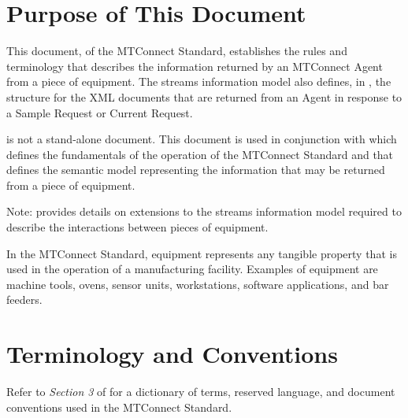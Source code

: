 \section{Purpose of This Document}

This document,  of the MTConnect  Standard, establishes the rules and terminology that describes the information returned by an MTConnect \gls{Agent} from a piece of equipment.  The \gls{streams information model} also defines, in , the structure for the XML documents that are returned from an \gls{Agent} in response to a \gls{Sample Request} or \gls{Current Request}.  

 is not a stand-alone document.   This document is used in conjunction with   which defines the fundamentals of the operation of the MTConnect Standard and  that defines the semantic model representing the information that may be returned from a piece of equipment.

\begin{note}
Note:  provides details on extensions to the \gls{streams information model} required to describe the interactions between pieces of equipment.
\end{note}

In the MTConnect Standard, equipment represents any tangible property that is used in the operation of a manufacturing facility.  Examples of equipment are machine tools, ovens, sensor units, workstations, software applications, and bar feeders.

\section{Terminology and Conventions}
Refer to \textit{Section 3} of  for a dictionary of terms, reserved language, and document conventions used in the MTConnect Standard.

\printglossary

\printacronyms  

\printbibliography[title=MTConnect References,keyword=MTC]

\printbibliography[title=Other References,notkeyword=MTC]